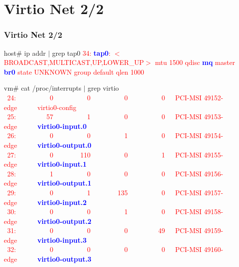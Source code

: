 \documentclass[aspectratio=169]{beamer}
\begin{document}
\section{Virtio Net 2/2}
\begin{frame}
\frametitle{Virtio Net 2/2}
\begin{block}{}

host\# ip addr $|$ grep tap0 \newline
\textcolor{red}{34: \textbf{\textcolor{blue}{tap0}}: $<$BROADCAST,MULTICAST,UP,LOWER\_UP$>$ mtu 1500 qdisc \textbf{\textcolor{blue}{mq}} master \textbf{\textcolor{blue}{br0}} state UNKNOWN group default qlen 1000} \newline

vm\# cat /proc/interrupts $|$ grep virtio \newline
\textcolor{red}{\ 24:\ \ \ \ \ \ \ \ \ \ 0\ \ \ \ \ \ \ \ \ \ 0\ \ \ \ \ \ \ \ \ \ 0\ \ \ \ \ \ \ \ \ \ 0\ \ \ PCI-MSI 49152-edge\ \ \ \ \ \ virtio0-config} \newline
\textcolor{red}{\ 25:\ \ \ \ \ \ \ \ \ 57\ \ \ \ \ \ \ \ \ \ 1\ \ \ \ \ \ \ \ \ \ 0\ \ \ \ \ \ \ \ \ \ 0\ \ \ PCI-MSI 49153-edge\ \ \ \ \ \ \textbf{\textcolor{blue}{virtio0-input.0}}} \newline
\textcolor{red}{\ 26:\ \ \ \ \ \ \ \ \ \ 0\ \ \ \ \ \ \ \ \ \ 0\ \ \ \ \ \ \ \ \ \ 1\ \ \ \ \ \ \ \ \ \ 0\ \ \ PCI-MSI 49154-edge\ \ \ \ \ \ \textbf{\textcolor{blue}{virtio0-output.0}}} \newline
\textcolor{red}{\ 27:\ \ \ \ \ \ \ \ \ \ 0\ \ \ \ \ \ \ \ 110\ \ \ \ \ \ \ \ \ \ 0\ \ \ \ \ \ \ \ \ \ 1\ \ \ PCI-MSI 49155-edge\ \ \ \ \ \ \textbf{\textcolor{blue}{virtio0-input.1}}} \newline
\textcolor{red}{\ 28:\ \ \ \ \ \ \ \ \ \ 1\ \ \ \ \ \ \ \ \ \ 0\ \ \ \ \ \ \ \ \ \ 0\ \ \ \ \ \ \ \ \ \ 0\ \ \ PCI-MSI 49156-edge\ \ \ \ \ \ \textbf{\textcolor{blue}{virtio0-output.1}}} \newline
\textcolor{red}{\ 29:\ \ \ \ \ \ \ \ \ \ 0\ \ \ \ \ \ \ \ \ \ 1\ \ \ \ \ \ \ \ 135\ \ \ \ \ \ \ \ \ \ 0\ \ \ PCI-MSI 49157-edge\ \ \ \ \ \ \textbf{\textcolor{blue}{virtio0-input.2}}} \newline
\textcolor{red}{\ 30:\ \ \ \ \ \ \ \ \ \ 0\ \ \ \ \ \ \ \ \ \ 0\ \ \ \ \ \ \ \ \ \ 1\ \ \ \ \ \ \ \ \ \ 0\ \ \ PCI-MSI 49158-edge\ \ \ \ \ \ \textbf{\textcolor{blue}{virtio0-output.2}}} \newline
\textcolor{red}{\ 31:\ \ \ \ \ \ \ \ \ \ 0\ \ \ \ \ \ \ \ \ \ 0\ \ \ \ \ \ \ \ \ \ 0\ \ \ \ \ \ \ \ \ 49\ \ \ PCI-MSI 49159-edge\ \ \ \ \ \ \textbf{\textcolor{blue}{virtio0-input.3}}} \newline
\textcolor{red}{\ 32:\ \ \ \ \ \ \ \ \ \ 0\ \ \ \ \ \ \ \ \ \ 0\ \ \ \ \ \ \ \ \ \ 0\ \ \ \ \ \ \ \ \ \ 0\ \ \ PCI-MSI 49160-edge\ \ \ \ \ \ \textbf{\textcolor{blue}{virtio0-output.3}}}
\end{block}
\end{frame}
\end{document}
